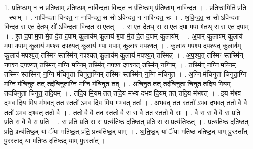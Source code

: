 \documentclass[17pt]{extarticle}
\begin{document}
1. प्र॒ति॒ष्ठाम् न न प्र॑ति॒ष्ठाम् प्र॑ति॒ष्ठाम् नावि॑न्दता विन्दत॒ न प्र॑ति॒ष्ठाम् प्र॑ति॒ष्ठाम् नावि॑न्दत । . प्र॒ति॒ष्ठामिति॑ प्रति - स्थाम् । . नावि॑न्दता विन्दत॒ न नावि॑न्दत॒ स सो॑ ऽविन्दत॒ न नावि॑न्दत॒ सः । . अ॒वि॒न्द॒त॒ स सो॑ ऽविन्दता विन्दत॒ स ए॒त दे॒तथ् सो॑ ऽविन्दता विन्दत॒ स ए॒तत् । . स ए॒त दे॒तथ् स स ए॒त द॒पा म॒पा मे॒तथ् स स ए॒त द॒पाम् । . ए॒त द॒पा म॒पा मे॒त दे॒त द॒पाम् कु॒लाय॑म् कु॒लाय॑ म॒पा मे॒त दे॒त द॒पाम् कु॒लाय᳚म् । . अ॒पाम् कु॒लाय॑म् कु॒लाय॑ म॒पा म॒पाम् कु॒लाय॑ मपश्य दपश्यत् कु॒लाय॑ म॒पा म॒पाम् कु॒लाय॑ मपश्यत् । . कु॒लाय॑ मपश्य दपश्यत् कु॒लाय॑म् कु॒लाय॑ मपश्य॒त् तस्मिꣳ॒॒ स्तस्मि॑न् नपश्यत् कु॒लाय॑म् कु॒लाय॑ मपश्य॒त् तस्मिन्न्॑ । . अ॒प॒श्य॒त् तस्मिꣳ॒॒ स्तस्मि॑न् नपश्य दपश्य॒त् तस्मि॑न् न॒ग्नि म॒ग्निम् तस्मि॑न् नपश्य दपश्य॒त् तस्मि॑न् न॒ग्निम् । . तस्मि॑न् न॒ग्नि म॒ग्निम् तस्मिꣳ॒॒ स्तस्मि॑न् न॒ग्नि म॑चिनुता चिनुता॒ग्निम् तस्मिꣳ॒॒ स्तस्मि॑न् न॒ग्नि म॑चिनुत । . अ॒ग्नि म॑चिनुता चिनुता॒ग्नि म॒ग्नि म॑चिनुत॒ तत् तद॑चिनुता॒ग्नि म॒ग्नि म॑चिनुत॒ तत् । . अ॒चि॒नु॒त॒ तत् तद॑चिनुता चिनुत॒ तदि॒य मि॒यम् तद॑चिनुता चिनुत॒ तदि॒यम् । . तदि॒य मि॒यम् तत् तदि॒य म॑भव दभव दि॒यम् तत् तदि॒य म॑भवत् । . इ॒य म॑भव दभव दि॒य मि॒य म॑भव॒त् तत॒ स्ततो॑ ऽभव दि॒य मि॒य म॑भव॒त् ततः॑ । . अ॒भ॒व॒त् तत॒ स्ततो॑ ऽभव दभव॒त् ततो॒ वै वै ततो॑ ऽभव दभव॒त् ततो॒ वै । . ततो॒ वै वै तत॒ स्ततो॒ वै स स वै तत॒ स्ततो॒ वै सः । . वै स स वै वै स प्रति॒ प्रति॒ स वै वै स प्रति॑ । . स प्रति॒ प्रति॒ स स प्रत्य॑तिष्ठ दतिष्ठ॒त् प्रति॒ स स प्रत्य॑तिष्ठत् । . प्रत्य॑तिष्ठ दतिष्ठ॒त् प्रति॒ प्रत्य॑तिष्ठ॒द् यां ॅया म॑तिष्ठ॒त् प्रति॒ प्रत्य॑तिष्ठ॒द् याम् । . अ॒ति॒ष्ठ॒द् यां ॅया म॑तिष्ठ दतिष्ठ॒द् याम् पु॒रस्ता᳚त् पु॒रस्ता॒द् या म॑तिष्ठ दतिष्ठ॒द् याम् पु॒रस्ता᳚त् । \newline
\end{document}
